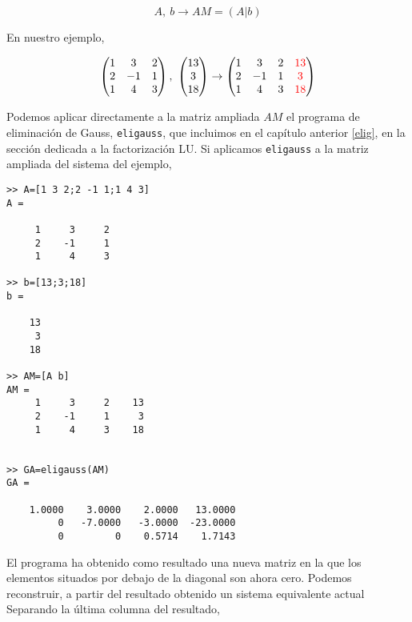 \begin{equation*}
A,\ b \rightarrow AM=(A\vert b)
\end{equation*} 

En nuestro ejemplo,

\begin{equation*}
\begin{pmatrix}
1& 3& 2\\
2& -1& 1\\
1& 4& 3
\end{pmatrix},\ \begin{pmatrix}
13\\
3\\
18
\end{pmatrix} \rightarrow
\begin{pmatrix}
1& 3& 2& {\color{red}13}\\
2& -1& 1& {\color{red}3}\\
1& 4& 3& {\color{red}18}
\end{pmatrix}
\end{equation*}

Podemos aplicar directamente a la matriz ampliada $AM$ el programa de eliminación de Gauss, \texttt{eligauss}, que incluimos en el capítulo anterior \ref{elig}, en la sección dedicada a la factorización LU. Si aplicamos \texttt{eligauss} a la matriz ampliada del sistema del ejemplo, 

\begin{verbatim}
>> A=[1 3 2;2 -1 1;1 4 3]
A =

     1     3     2
     2    -1     1
     1     4     3

>> b=[13;3;18]
b =

    13
     3
    18

>> AM=[A b]
AM =
     1     3     2    13
     2    -1     1     3
     1     4     3    18
     

>> GA=eligauss(AM)
GA =

    1.0000    3.0000    2.0000   13.0000
         0   -7.0000   -3.0000  -23.0000
         0         0    0.5714    1.7143
\end{verbatim}

El programa ha obtenido como resultado una nueva matriz en la que los elementos situados por debajo de la diagonal son ahora cero. Podemos reconstruir, a partir del resultado obtenido un sistema equivalente actual Separando la última columna del resultado,

